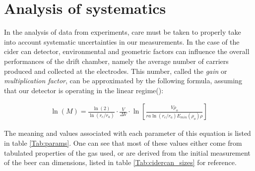\section{Analysis of systematics}
\label{sec:systematics}
In the analysis of data from experiments, care must be taken to properly take into account systematic uncertainties in our measurements. In the case of the cider can detector, environmental and geometric factors can influence the overall performances of the drift chamber, namely the average number of carriers produced and collected at the electrodes. This number, called the \textit{gain} or \textit{multiplication factor}, can be approximated by the following formula, assuming that our detector is operating in the linear regime(\cite{gas_detect}):

\begin{adjustwidth}{-2cm}{}
\begin{align}
\ln(M)=\frac{\ln(2)}{\ln(r_{c}/r_{a})}\cdot\frac{V}{\Delta V}\cdot\ln\left[ \frac{V\rho_{o}}{ra\ln(r_{c}/r_{a})E_{min}(\rho_{o})\rho}\right]
\label{eq:lnm}
\end{align}
\end{adjustwidth}

The meaning and values associated with each parameter of this equation is listed in table \ref{Tab:params}. One can see that most of these values either come from tabulated properties of the gas used, or are derived from the initial measurement of the beer can dimensions, listed in table \ref{Tab:cidercan_sizes} for reference.

